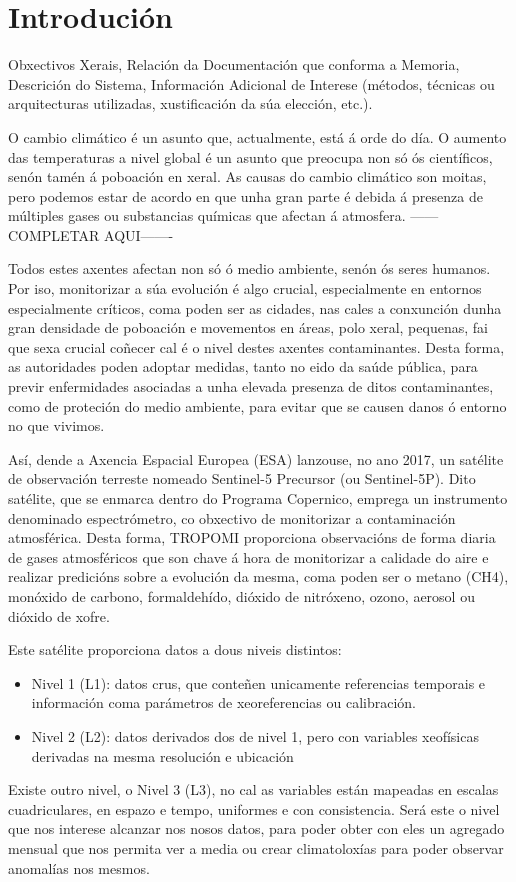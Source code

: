 \chapter{Introdución}

Obxectivos Xerais, Relación da Documentación que conforma a Memoria,
Descrición do Sistema, Información Adicional de Interese (métodos, técnicas ou
arquitecturas utilizadas, xustificación da súa elección, etc.).
\newline

O cambio climático é un asunto que, actualmente, está á orde do día. O aumento das temperaturas a nivel global é un asunto que preocupa non só ós
científicos, senón tamén á poboación en xeral. As causas do cambio climático son moitas, pero podemos estar de acordo en que unha gran parte é
debida á presenza de múltiples gases ou substancias químicas que afectan á atmosfera.
------COMPLETAR AQUI-------

Todos estes axentes afectan non só ó medio ambiente, senón ós seres humanos. Por iso, monitorizar a súa evolución é algo crucial, especialmente en
entornos especialmente críticos, coma poden ser as cidades, nas cales a conxunción dunha gran densidade de poboación e movementos en áreas, polo xeral,
pequenas, fai que sexa crucial coñecer cal é o nivel destes axentes contaminantes. Desta forma, as autoridades poden adoptar medidas, tanto no eido
da saúde pública, para previr enfermidades asociadas a unha elevada presenza de ditos contaminantes, como de proteción do medio ambiente, para evitar
que se causen danos ó entorno no que vivimos.

Así, dende a Axencia Espacial Europea (ESA) lanzouse, no ano 2017, un satélite de observación terreste nomeado Sentinel-5 Precursor (ou Sentinel-5P).
Dito satélite, que se enmarca dentro do Programa Copernico, emprega un instrumento denominado espectrómetro, co obxectivo de monitorizar a contaminación
atmosférica. Desta forma, TROPOMI proporciona observacións de forma diaria de gases atmosféricos que son chave á hora de monitorizar a calidade do aire
e realizar predicións sobre a evolución da mesma, coma poden ser o metano (CH4), monóxido de carbono, formaldehído, dióxido de nitróxeno, ozono, aerosol ou
dióxido de xofre.

Este satélite proporciona datos a dous niveis distintos:
\begin{itemize}
    \item Nivel 1 (L1): datos crus, que conteñen unicamente referencias temporais e información coma parámetros de xeoreferencias ou calibración.
    \item Nivel 2 (L2): datos derivados dos de nivel 1, pero con variables xeofísicas derivadas na mesma resolución e ubicación
\end{itemize}
Existe outro nivel, o Nivel 3 (L3), no cal as variables están mapeadas en escalas cuadriculares, en espazo e tempo, uniformes e con consistencia.
Será este o nivel que nos interese alcanzar nos nosos datos, para poder obter con eles un agregado mensual que nos permita ver a media ou crear climatoloxías
para poder observar anomalías nos mesmos.

